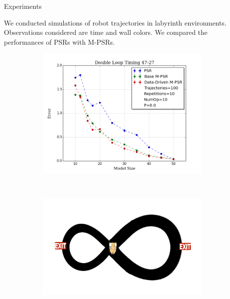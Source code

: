 \documentclass[final]{beamer}
\newlength{\sepwid}
\newlength{\onecolwid}
\begin{document}
\begin{frame}[t]
\begin{columns}[t]
\begin{column}{\sepwid}\end{column} %
\begin{column}{\onecolwid} %


\begin{block}{Experiments}

We conducted simulations of robot trajectories in labyrinth environments. Observations considered are time and wall colors. We compared the performances of PSRs with M-PSRs.
  \begin{figure}
      \begin{subfigure}[b]{0.48\textwidth}
        \includegraphics[width=\textwidth]{figs/DL/47-27-10000.png}
        \caption{}
      \end{subfigure}
      ~
      \begin{subfigure}[b]{0.48\textwidth}
        \includegraphics[width=\textwidth]{figs/DL/doubleLoopImage.png}

\end{subfigure}
\end{figure}
\end{block}
\end{column}
\end{columns}
\end{frame}
\end{document}
